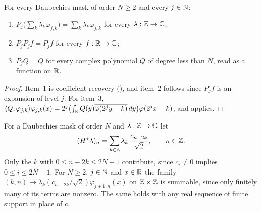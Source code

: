 \begin{proposition}[Reproduction]
\label{prop:daub-proj-reproduction}
\leanok
{}
For every Daubechies mask of order $N \geq 2$ and every $j \in \mathbb{N}$:
\begin{enumerate}
  \item $P_j \bigl(\sum_k \lambda_k \varphi_{j,k}\bigr) = \sum_k \lambda_k \varphi_{j,k}$ for every
    $\lambda : \mathbb{Z} \to \mathbb{C}$;
  \item $P_j P_j f = P_j f$ for every $f : \mathbb{R} \to \mathbb{C}$;
  \item $P_j Q = Q$ for every complex polynomial $Q$ of degree less than $N$, read as a function
    on $\mathbb{R}$.
\end{enumerate}
\end{proposition}

\begin{proof}
\leanok
{}
Item~1 is coefficient recovery (), and item~2 follows since
$P_j f$ is an expansion of level $j$. For item~3,
$\langle Q, \varphi_{j,k} \rangle \varphi_{j,k}(x)
= 2^j \bigl(\int_{\mathbb{R}} Q(y) \overline{\varphi(2^j y - k)} \, dy\bigr) \varphi(2^j x - k)$, and
 applies.
\end{proof}

\begin{definition}
\label{def:daub-refine-coeff}
\leanok
{}
For a Daubechies mask of order $N$ and $\lambda : \mathbb{Z} \to \mathbb{C}$ let
\[
  (H^* \lambda)_n = \sum_{k \in \mathbb{Z}} \lambda_k \, \frac{c_{n-2k}}{\sqrt 2} , \qquad n \in \mathbb{Z} .
\]
Only the $k$ with $0 \leq n - 2k \leq 2N - 1$ contribute, since $c_i \neq 0$ implies
$0 \leq i \leq 2N - 1$. For $N \geq 2$, $j \in \mathbb{N}$ and $x \in \mathbb{R}$ the family
$(k, n) \mapsto \lambda_k (c_{n-2k}/\sqrt 2) \varphi_{j+1,n}(x)$ on $\mathbb{Z} \times \mathbb{Z}$ is summable,
since only finitely many of its terms are nonzero. The same holds with any real sequence of finite
support in place of $c$.
\end{definition}

